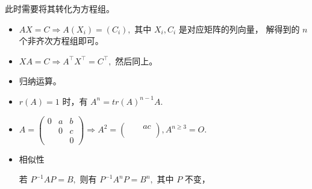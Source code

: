 此时需要将其转化为方程组。

\begin{itemize}
    \item $ AX = C \Rightarrow A(X_i) = (C_i), $ 其中 $ X_i,C_i $ 是对应矩阵的列向量，
    解得到的 $ n $ 个非齐次方程组即可。
    \item $ XA = C \Rightarrow A^\top X^\top = C^\top, $ 然后同上。
\end{itemize}


\begin{itemize}
    \item 归纳运算。
    \item $ r(A) = 1 $ 时，有 $ A^n = tr(A)^{n-1}A. $ 
    \item $ A = \begin{pmatrix}
        0 & a & b \\ & 0 & c\\ && 0
    \end{pmatrix} \Rightarrow A^2 = \begin{pmatrix}
        &&ac\\ && \\&&
    \end{pmatrix}, A^{n\geq 3} = O.$ 
    \item 相似性
    
    若 $ P^{-1}AP = B, $ 则有 $ P^{-1}A^nP = B^n, $ 其中 $ P $ 不变，
\end{itemize}
